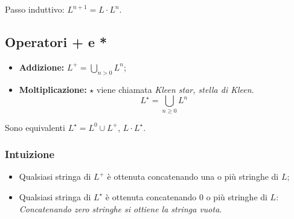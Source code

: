 Passo induttivo: $L^{n+1}=L\cdot L^n$.

\subsection{Operatori + e *}
\begin{itemize}
  \item \textbf{Addizione:} $L^+=\bigcup_{n>0}L^n$;
  \item \textbf{Moltiplicazione:} $\star$ viene chiamata \textit{Kleen star,
    stella di Kleen}.
    \[L^\star = \bigcup_{n\geq0}L^n\]
\end{itemize}
Sono equivalenti $L^\star=L^0\cup L^+$, $L\cdot L^\star$.

\subsubsection{Intuizione}
\begin{itemize}
  \item Qualsiasi stringa di $L^+$ è ottenuta concatenando una o più stringhe
    di $L$;
  \item Qualsiasi stringa di $L^\star$ è ottenuta concatenando $0$ o più
    stringhe di $L$: \emph{Concatenando zero stringhe si ottiene la stringa
    vuota}.
\end{itemize}

